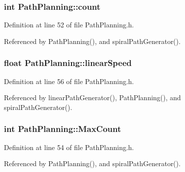 \subsubsection[{\texorpdfstring{count}{count}}]{\setlength{\rightskip}{0pt plus 5cm}int Path\+Planning\+::count\hspace{0.3cm}{\ttfamily [private]}}\hypertarget{classPathPlanning_a8ffa246d97c8d79cb18a1fd61e805467}{}\label{classPathPlanning_a8ffa246d97c8d79cb18a1fd61e805467}


Definition at line 52 of file Path\+Planning.\+h.



Referenced by Path\+Planning(), and spiral\+Path\+Generator().

\subsubsection[{\texorpdfstring{linear\+Speed}{linearSpeed}}]{\setlength{\rightskip}{0pt plus 5cm}float Path\+Planning\+::linear\+Speed\hspace{0.3cm}{\ttfamily [private]}}\hypertarget{classPathPlanning_a88e654d2dffefce6b3253dca0d05af2c}{}\label{classPathPlanning_a88e654d2dffefce6b3253dca0d05af2c}


Definition at line 56 of file Path\+Planning.\+h.



Referenced by linear\+Path\+Generator(), Path\+Planning(), and spiral\+Path\+Generator().

\subsubsection[{\texorpdfstring{Max\+Count}{MaxCount}}]{\setlength{\rightskip}{0pt plus 5cm}int Path\+Planning\+::\+Max\+Count\hspace{0.3cm}{\ttfamily [private]}}\hypertarget{classPathPlanning_a1346e45eb6566236a55b666e350cb62b}{}\label{classPathPlanning_a1346e45eb6566236a55b666e350cb62b}


Definition at line 54 of file Path\+Planning.\+h.



Referenced by Path\+Planning(), and spiral\+Path\+Generator().

